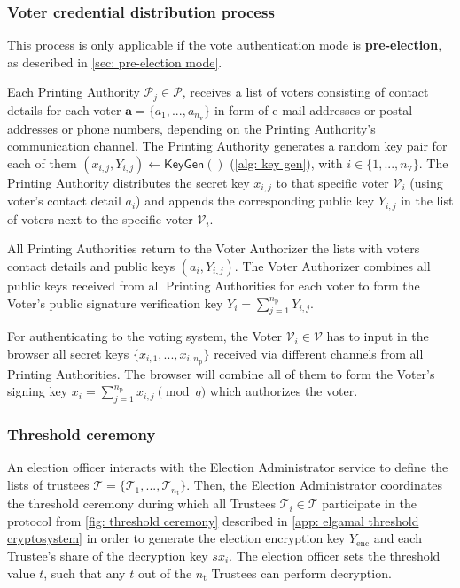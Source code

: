 \subsubsection{Voter credential distribution process} \label{sec: voter credential distribution process}
This process is only applicable if the vote authentication mode is \textbf{pre-election}, as described in \cref{sec: pre-election mode}.

Each Printing Authority $\mathcal{P}_j \in \boldsymbol{\mathcal{P}}$, receives a list of voters consisting of contact details for each voter $\boldsymbol{a} = \{ a_1, ..., a_{n_\mathrm{v}} \}$ in form of e-mail addresses or postal addresses or phone numbers, depending on the Printing Authority's communication channel. The Printing Authority generates a random key pair for each of them $(x_{i, j}, Y_{i, j}) \leftarrow \mathsf{KeyGen}()$ (\cref{alg: key gen}), with $i \in \{ 1, ..., n_\mathrm{v} \}$. The Printing Authority distributes the secret key $x_{i, j}$ to that specific voter $\mathcal{V}_i$ (using voter's contact detail $a_i$) and appends the corresponding public key $Y_{i, j}$ in the list of voters next to the specific voter $\mathcal{V}_i$.

All Printing Authorities return to the Voter Authorizer the lists with voters contact details and public keys $(a_i, Y_{i,j})$. The Voter Authorizer combines all public keys received from all Printing Authorities for each voter to form the Voter's public signature verification key $Y_i = \sum_{j=1}^{n_\mathrm{p}} Y_{i, j}$.

For authenticating to the voting system, the Voter $\mathcal{V}_i \in \boldsymbol{\mathcal{V}}$ has to input in the browser all secret keys $\{ x_{i, 1}, ..., x_{i, n_\mathrm{p}} \}$ received via different channels from all Printing Authorities. The browser will combine all of them to form the Voter's signing key $x_i = \sum_{j=1}^{n_\mathrm{p}} x_{i, j} \pmod q$ which authorizes the voter.


\subsubsection{Threshold ceremony} \label{sec: threshold ceremony}
An election officer interacts with the Election Administrator service to define the lists of trustees $\boldsymbol{\mathcal{T}} = \{ \mathcal{T}_1, ..., \mathcal{T}_{n_\mathrm{t}} \}$. Then, the Election Administrator coordinates the threshold ceremony during which all Trustees $\mathcal{T}_i \in \boldsymbol{\mathcal{T}}$ participate in the protocol from \cref{fig: threshold ceremony} described in \cref{app: elgamal threshold cryptosystem} in order to generate the election encryption key $Y_\mathrm{enc}$ and each Trustee's share of the decryption key $sx_i$. The election officer sets the threshold value $t$, such that any $t$ out of the $n_\mathrm{t}$ Trustees can perform decryption.

